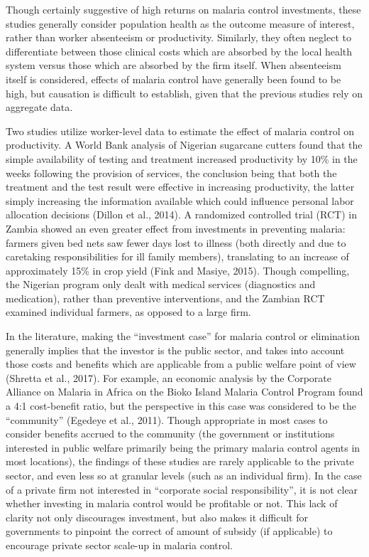 \documentclass[]{article}
\begin{document}
Though certainly suggestive of high returns on malaria control
investments, these studies generally consider population health as the
outcome measure of interest, rather than worker absenteeism or
productivity. Similarly, they often neglect to differentiate between
those clinical costs which are absorbed by the local health system
versus those which are absorbed by the firm itself. When absenteeism
itself is considered, effects of malaria control have generally been
found to be high, but causation is difficult to establish, given that
the previous studies rely on aggregate data.

Two studies utilize worker-level data to estimate the effect of malaria
control on productivity. A World Bank analysis of Nigerian sugarcane
cutters found that the simple availability of testing and treatment
increased productivity by 10\% in the weeks following the provision of
services, the conclusion being that both the treatment and the test
result were effective in increasing productivity, the latter simply
increasing the information available which could influence personal
labor allocation decisions (Dillon et al., 2014). A randomized
controlled trial (RCT) in Zambia showed an even greater effect from
investments in preventing malaria: farmers given bed nets saw fewer days
lost to illness (both directly and due to caretaking responsibilities
for ill family members), translating to an increase of approximately
15\% in crop yield (Fink and Masiye, 2015). Though compelling, the
Nigerian program only dealt with medical services (diagnostics and
medication), rather than preventive interventions, and the Zambian RCT
examined individual farmers, as opposed to a large firm.

In the literature, making the ``investment case'' for malaria control or
elimination generally implies that the investor is the public sector,
and takes into account those costs and benefits which are applicable
from a public welfare point of view (Shretta et al., 2017). For example,
an economic analysis by the Corporate Alliance on Malaria in Africa on
the Bioko Island Malaria Control Program found a 4:1 cost-benefit ratio,
but the perspective in this case was considered to be the ``community''
(Egedeye et al., 2011). Though appropriate in most cases to consider
benefits accrued to the community (the government or institutions
interested in public welfare primarily being the primary malaria control
agents in most locations), the findings of these studies are rarely
applicable to the private sector, and even less so at granular levels
(such as an individual firm). In the case of a private firm not
interested in ``corporate social responsibility'', it is not clear
whether investing in malaria control would be profitable or not. This
lack of clarity not only discourages investment, but also makes it
difficult for governments to pinpoint the correct of amount of subsidy
(if applicable) to encourage private sector scale-up in malaria control.
\end{document}
